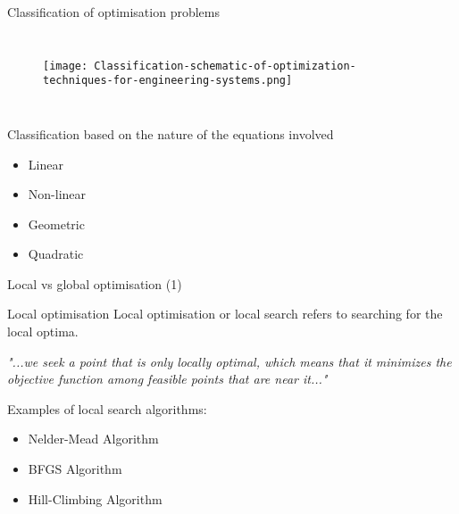 \documentclass[10pt,aspectratio=169,notes]{beamer} %
\begin{document}
\begin{frame}{Classification of optimisation problems}
\begin{columns}[T]
	\begin{figure}
		\texttt{[image: Classification-schematic-of-optimization-techniques-for-engineering-systems.png]}
	\end{figure}
	\begin{biblio}{}
	\end{biblio}
\end{columns}	
\end{frame}
\note{}
\begin{frame}{Classification based on the nature of the equations
involved}
\begin{itemize}
	\item Linear
	\item Non-linear
	\item Geometric
	\item Quadratic
\end{itemize}
\end{frame}
\note{}
\begin{frame}{Local vs global optimisation (1)}
\begin{alertblock}{Local optimisation}
	Local optimisation or local search refers to searching for the local optima.
\end{alertblock}
	
\emph{"...we seek a point that is only locally optimal, which means that it minimizes the objective function among feasible points that are near it..."}
\begin{biblio}{}
\end{biblio}
\vspace{8mm}
Examples of local search algorithms:
\begin{itemize}
	\item Nelder-Mead Algorithm
	\item BFGS Algorithm
	\item Hill-Climbing Algorithm
\end{itemize}	
\end{frame}
\end{document}
